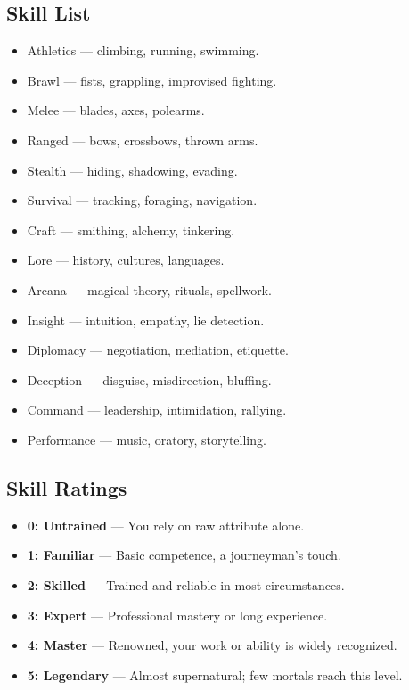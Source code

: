 \documentclass[12pt]{book}
\begin{document}
\subsection*{Skill List}
\begin{multicols}{2}
\begin{itemize}
  \item Athletics — climbing, running, swimming.
  \item Brawl — fists, grappling, improvised fighting.
  \item Melee — blades, axes, polearms.
  \item Ranged — bows, crossbows, thrown arms.
  \item Stealth — hiding, shadowing, evading.
  \item Survival — tracking, foraging, navigation.
  \item Craft — smithing, alchemy, tinkering.
  \item Lore — history, cultures, languages.
  \item Arcana — magical theory, rituals, spellwork.
  \item Insight — intuition, empathy, lie detection.
  \item Diplomacy — negotiation, mediation, etiquette.
  \item Deception — disguise, misdirection, bluffing.
  \item Command — leadership, intimidation, rallying.
  \item Performance — music, oratory, storytelling.
\end{itemize}
\end{multicols}

\subsection*{Skill Ratings}
\begin{itemize}
  \item \textbf{0: Untrained} — You rely on raw attribute alone.  
  \item \textbf{1: Familiar} — Basic competence, a journeyman’s touch.  
  \item \textbf{2: Skilled} — Trained and reliable in most circumstances.  
  \item \textbf{3: Expert} — Professional mastery or long experience.  
  \item \textbf{4: Master} — Renowned, your work or ability is widely recognized.  
  \item \textbf{5: Legendary} — Almost supernatural; few mortals reach this level.  
\end{itemize}
\end{document}
